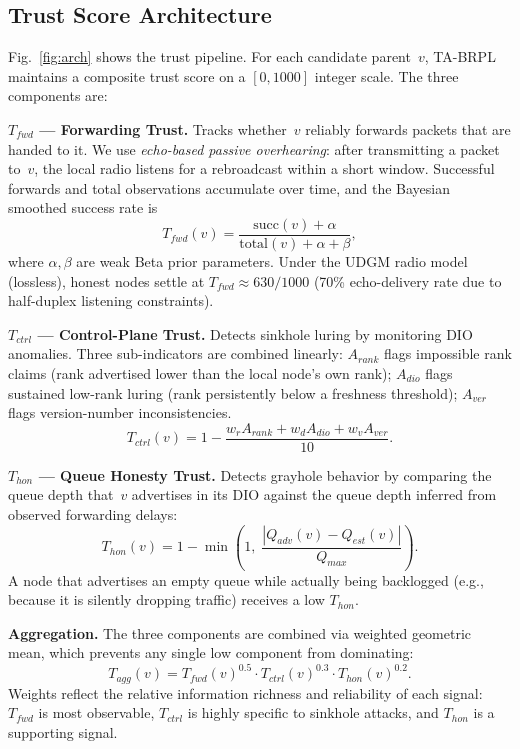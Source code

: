 \documentclass[conference]{IEEEtran}
\begin{document}
\subsection{Trust Score Architecture}
\label{sec:trust}

Fig.~\ref{fig:arch} shows the trust pipeline.
For each candidate parent~$v$, TA-BRPL maintains a composite trust score
on a $[0, 1000]$ integer scale.
The three components are:

\medskip\noindent\textbf{$T_{fwd}$ --- Forwarding Trust.}
Tracks whether~$v$ reliably forwards packets that are handed to it.
We use \emph{echo-based passive overhearing}:
after transmitting a packet to~$v$, the local radio listens for a
rebroadcast within a short window.
Successful forwards and total observations accumulate over time,
and the Bayesian smoothed success rate is
\begin{equation}
  T_{fwd}(v) = \frac{\text{succ}(v) + \alpha}{\text{total}(v) + \alpha + \beta},
\end{equation}
where $\alpha, \beta$ are weak Beta prior parameters.
Under the UDGM radio model (lossless), honest nodes settle at
$T_{fwd} \approx 630/1000$ (70\% echo-delivery rate due to half-duplex
listening constraints).

\medskip\noindent\textbf{$T_{ctrl}$ --- Control-Plane Trust.}
Detects sinkhole luring by monitoring DIO anomalies.
Three sub-indicators are combined linearly:
$A_{rank}$ flags impossible rank claims (rank advertised lower than
  the local node's own rank);
$A_{dio}$ flags sustained low-rank luring (rank persistently below
  a freshness threshold);
$A_{ver}$ flags version-number inconsistencies.
\begin{equation}
  T_{ctrl}(v) = 1 - \frac{w_r A_{rank} + w_d A_{dio} + w_v A_{ver}}{10}.
\end{equation}

\medskip\noindent\textbf{$T_{hon}$ --- Queue Honesty Trust.}
Detects grayhole behavior by comparing the queue depth that~$v$
advertises in its DIO against the queue depth inferred from
observed forwarding delays:
\begin{equation}
  T_{hon}(v) = 1 - \min\!\left(1,\;
    \frac{|Q_{adv}(v) - Q_{est}(v)|}{Q_{max}}\right).
\end{equation}
A node that advertises an empty queue while actually being backlogged
(e.g., because it is silently dropping traffic) receives a low $T_{hon}$.

\medskip\noindent\textbf{Aggregation.}
The three components are combined via weighted geometric mean,
which prevents any single low component from dominating:
\begin{equation}
  T_{agg}(v) = T_{fwd}(v)^{0.5} \cdot T_{ctrl}(v)^{0.3}
               \cdot T_{hon}(v)^{0.2}.
  \label{eq:tagg}
\end{equation}
Weights reflect the relative information richness and reliability
of each signal: $T_{fwd}$ is most observable, $T_{ctrl}$ is
highly specific to sinkhole attacks, and $T_{hon}$ is a supporting signal.
\end{document}
